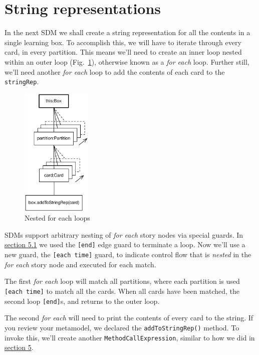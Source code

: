 \newpage
\section{String representations}
\genHeader
\hypertarget{sec:stringRep}{}

In the next SDM we shall create a string representation for all the contents in a single learning box. To accomplish this, we will have to iterate through 
every card, in every partition. This means we'll need to create an inner loop nested within an outer loop (Fig.~\ref{fig:goal_stringRep}), otherwise known as a
\emph{for each} loop.
Further still, we'll need another \emph{for each} loop to add the contents of each card to the \texttt{stringRep}.

\begin{figure}[htbp]
	\centering
	\includegraphics[width=0.3\textwidth]{goal_stringRep.pdf}
	\caption{Nested for each loops}
	\label{fig:goal_stringRep}
\end{figure}
\FloatBarrier

SDMs support arbitrary nesting of \emph{for each} story nodes via special guards. In \hyperlink{emptyPartition vis}{section 5.1} we used the \texttt{[end]} edge
guard to terminate a loop. Now we'll use a new guard, the \texttt{[each time]} guard, to indicate control flow that is \emph{nested} in
the \emph{for each} story node and executed for each match.

The first \emph{for each} loop will match all partitions, where each partition is used \texttt{[each time]} to match all the cards.  When 
all cards have been matched, the second loop \texttt{[end]}s, and returns to the outer loop.

The second \emph{for each} will need to print the contents of every card to the string. If you review your metamodel, we declared the \texttt{addToStringRep()}
method. To invoke this, we'll create another \texttt{MethodCallExpression}, similar to how we did in \hyperlink{sec:growBox}{section 5}.


 



